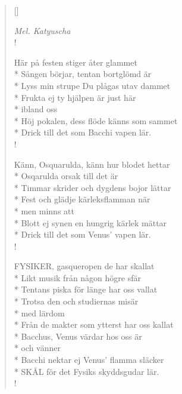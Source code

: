\settowidth{\versewidth}{Frukta ej ty hjälpen är just här}


\begin{verse}[\versewidth]

\flagverse{}
\emph{Mel. Katyuscha}\\!

Här på festen stiger åter glammet\\*
Sången börjar, tentan bortglömd är\\*
Lyss min strupe Du plågas utav dammet\\*
Frukta ej ty hjälpen är just här\\*
ibland oss\\*
Höj pokalen, dess flöde känns som sammet\\*
Drick till det som Bacchi vapen lär.\\!


Känn, Osquarulda, känn hur blodet hettar\\*
Osqarulda orsak till det är\\*
Timmar skrider och dygdens bojor lättar\\*
Fest och glädje kärleksflamman när\\*
men minns att\\*
Blott ej synen en hungrig kärlek mättar\\*
Drick till det som Venus' vapen lär.\\!


FYSIKER, gasqueropen de har skallat\\*
Likt musik från någon högre sfär\\*
Tentans piska för länge har oss vallat\\*
Trotsa den och studiernas misär\\*
med lärdom\\*
Från de makter som ytterst har oss kallat\\*
Bacchus, Venus värdar hos oss är\\*
och vänner\\*
Bacchi nektar ej Venus' flamma släcker \\*
SKÅL för det Fysiks skyddsgudar lär. \\!




\end{verse}

